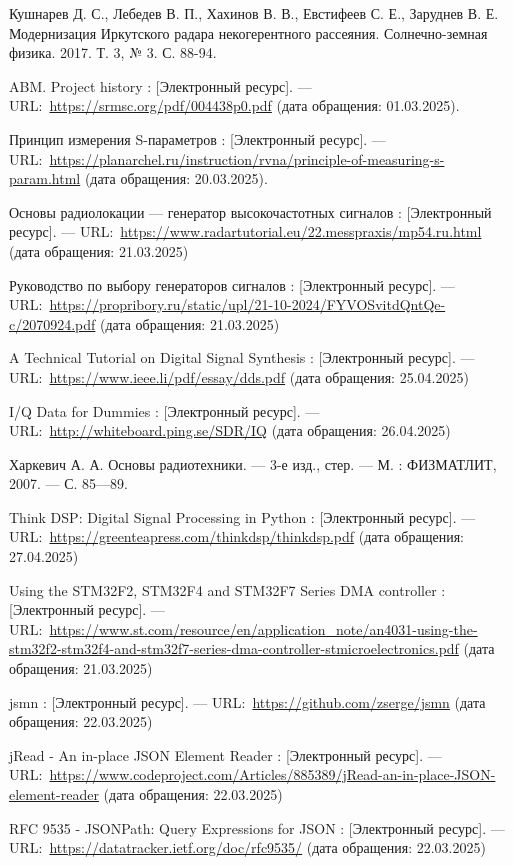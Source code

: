 \documentclass{report}
\begin{document}
\begin{thebibliography}{}

 Кушнарев Д. С., Лебедев В. П., Хахинов В. В., Евстифеев С. Е., Заруднев В. Е. Модернизация Иркутского радара некогерентного рассеяния. Солнечно-земная физика. 2017. Т. 3, № 3. С. 88-94.

 ABM. Project history : [Электронный ресурс]. --– URL:~\url{https://srmsc.org/pdf/004438p0.pdf} (дата обращения: 01.03.2025).

 Принцип измерения S-параметров : [Электронный ресурс]. --– URL:~\url{https://planarchel.ru/instruction/rvna/principle-of-measuring-s-param.html} (дата обращения: 20.03.2025).

 Основы радиолокации --- генератор высокочастотных сигналов : [Электронный ресурс]. --– URL:~\url{https://www.radartutorial.eu/22.messpraxis/mp54.ru.html} (дата обращения: 21.03.2025)

 Руководство по выбору генераторов сигналов : [Электронный ресурс]. --– URL:~\url{https://propribory.ru/static/upl/21-10-2024/FYVOSvitdQntQe-c/2070924.pdf} (дата обращения: 21.03.2025)

 A Technical Tutorial on Digital Signal Synthesis : [Электронный ресурс]. --– URL:~\url{https://www.ieee.li/pdf/essay/dds.pdf} (дата обращения: 25.04.2025)

 I/Q Data for Dummies : [Электронный ресурс]. --– URL:~\url{http://whiteboard.ping.se/SDR/IQ} (дата обращения: 26.04.2025)

 Харкевич А. А. Основы радиотехники. --- 3-е изд., стер. --- М. : ФИЗМАТЛИТ, 2007. --- С. 85---89.

 Think DSP: Digital Signal Processing in Python : [Электронный ресурс]. --– URL:~\url{https://greenteapress.com/thinkdsp/thinkdsp.pdf} (дата обращения: 27.04.2025)

 Using the STM32F2, STM32F4 and STM32F7 Series DMA controller : [Электронный ресурс]. --– URL:~\url{https://www.st.com/resource/en/application_note/an4031-using-the-stm32f2-stm32f4-and-stm32f7-series-dma-controller-stmicroelectronics.pdf} (дата обращения: 21.03.2025)

 jsmn : [Электронный ресурс]. --– URL:~\url{https://github.com/zserge/jsmn} (дата обращения: 22.03.2025)

 jRead - An in-place JSON Element Reader : [Электронный ресурс]. --– URL:~\url{https://www.codeproject.com/Articles/885389/jRead-an-in-place-JSON-element-reader} (дата обращения: 22.03.2025)

 RFC 9535 - JSONPath: Query Expressions for JSON : [Электронный ресурс]. --– URL:~\url{https://datatracker.ietf.org/doc/rfc9535/} (дата обращения: 22.03.2025)

\end{thebibliography}
\end{document}
